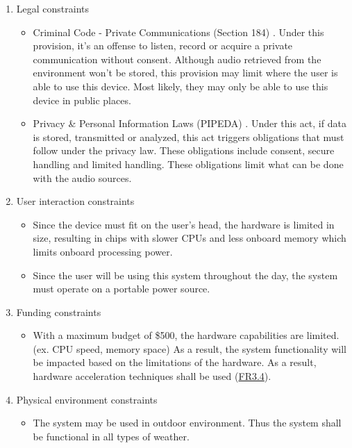 \documentclass[12pt]{article}
\theoremstyle{definition}
\begin{document}
\begin{enumerate}
  \item Legal constraints
  \begin{itemize}
    \item Criminal Code - Private Communications (Section 184)
    \cite{CriminalCode184}. Under this provision, it's an offense to listen,
    record or acquire a private communication without consent. Although audio
    retrieved from the environment won't be stored, this provision may limit
    where the user is able to use this device. Most likely, they may only be
    able to use this device in public places.
    \item Privacy \& Personal Information Laws (PIPEDA) \cite{PIPEDA2000}. Under
    this act, if data is stored, transmitted or analyzed, this act triggers
    obligations that must follow under the privacy law. These obligations
    include consent, secure handling and limited handling. These obligations
    limit what can be done with the audio sources.
  \end{itemize}

  \item User interaction constraints
  \begin{itemize}
    \item Since the device must fit on the user's head, the hardware is limited
    in size, resulting in chips with slower CPUs and less onboard memory which
    limits onboard processing power. 
    \item Since the user will be using this system throughout the day, the
    system must operate on a portable power source.
  \end{itemize}

  \item Funding constraints
  \begin{itemize}
    \item With a maximum budget of \$500, the hardware capabilities are limited.
    (ex. CPU speed, memory space) As a result, the system functionality will be
    impacted based on the limitations of the hardware. As a result, hardware
    acceleration techniques shall be used (\hyperref[FR3_4]{FR3.4}).
  \end{itemize}

  \item Physical environment constraints
  \begin{itemize}
    \item The system may be used in outdoor environment. Thus the system shall
    be functional in all types of weather.
  \end{itemize}
\end{enumerate}
\end{document}
